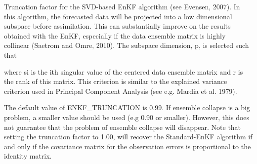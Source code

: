 \documentclass[a4paper,10pt,english]{sphinxmanual}
\begin{document}
\begin{sphinxShadowBox}

Truncation factor for the SVD-based EnKF algorithm (see Evensen, 2007). In
this algorithm, the forecasted data will be projected into a low dimensional
subspace before assimilation. This can substantially improve on the results
obtained with the EnKF, especially if the data ensemble matrix is highly
collinear (Saetrom and Omre, 2010). The subspace dimension, p, is selected
such that

%
\begin{sphinxVerbatim}[commandchars=\\\{\}]
\PYGZbs{}\PYGZbs{} \PYGZbs{}  \PYGZbs{} \PYGZbs{}\PYGZbs{}
\end{sphinxVerbatim}

where si is the ith singular value of the centered data ensemble matrix and r
is the rank of this matrix. This criterion is similar to the explained
variance criterion used in Principal Component Analysis (see e.g. Mardia et
al. 1979).

The default value of ENKF\_TRUNCATION is 0.99. If ensemble collapse is a big
problem, a smaller value should be used (e.g 0.90 or smaller). However, this
does not guarantee that the problem of ensemble collapse will disappear. Note
that setting the truncation factor to 1.00, will recover the Standard-EnKF
algorithm if and only if the covariance matrix for the observation errors is
proportional to the identity matrix.
\end{sphinxShadowBox}
\label{\detokenize{keywords/index:std-scale-correlated-obs}}
\end{document}
